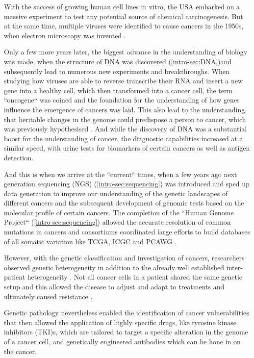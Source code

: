 With the success of growing human cell lines in vitro, the USA embarked on a massive experiment to test any potential source of chemical carcinogenesis. But at the same time, multiple viruses were identified to cause cancers in the 1950s, when electron microscopy was invented \cite{Claude1947}.

Only a few more years later, the biggest advance in the understanding of biology was made, when the structure of DNA was discovered \cite{Watson1953} (\autoref{intro-sec:DNA})and subsequently lead to numerous new experiments and breakthroughs. When studying how viruses are able to reverse transcribe their RNA and insert a new gene into a healthy cell, which then transformed into a cancer cell, the term ``oncogene`` was coined \cite{Huebner1969,Baltimore1970,Temin1970} and the foundation for the understanding of how genes influence the emergence of cancers was laid. This also lead to the understanding, that heritable changes in the genome could predispose a person to cancer, which was previously hypothesised \cite{Li1969}. And while the discovery of DNA was a substantial boost for the understanding of cancer, the diagnostic capabilities increased at a similar speed, with urine tests for biomarkers of certain cancers as well as antigen detection.

And this is when we arrive at the ``current`` times, when a few years ago next generation sequencing (NGS) (\autoref{intro-sec:sequencing}) was introduced and sped up data generation to improve our understanding of the genetic landscapes of different cancers and the subsequent development of genomic tests based on the molecular profile of certain cancers.
The completion of the ``Human Genome Project`` (\autoref{intro-sec:sequencing}) allowed the accurate resolution of common mutations in cancers and consortiums coordinated large efforts to build databases of all somatic variation like TCGA, ICGC and PCAWG \cite{IPCAWGC2020}.

However, with the genetic classification and investigation of cancers, researchers observed genetic heterogeneity in addition to the already well established inter-patient heterogeneity \cite{Swanton2012}. Not all cancer cells in a patient shared the same genetic setup and this allowed the disease to adjust and adapt to treatments and ultimately caused resistance \cite{Burrell2014}.

Genetic pathology nevertheless enabled the identification of cancer vulnerabilities that then allowed the application of highly specific drugs, like tyrosine kinase inhibitors (TKI)s, which are tailored to target a specific alteration in the genome of a cancer cell, and genetically engineered antibodies which can be hone in on the cancer. 

